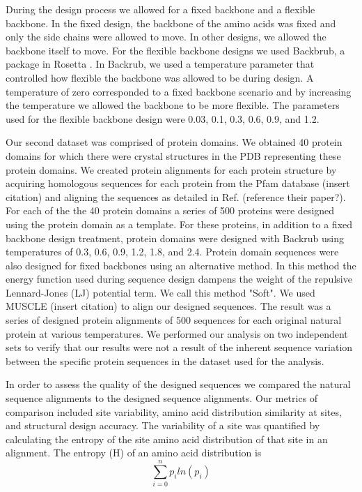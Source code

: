 \documentclass[12pt]{article}
\begin{document}
\par During the design process we allowed for a fixed backbone and a flexible backbone. In the fixed design, the backbone of the amino acids was fixed and only the side chains were allowed to move. In other designs, we allowed the backbone itself to move. For the flexible backbone designs we used Backbrub, a package in Rosetta \cite{Smith2008}. In Backrub, we used a temperature parameter that controlled how flexible the backbone was allowed to be during design. A temperature of zero corresponded to a fixed backbone scenario and by increasing the temperature we allowed the backbone to be more flexible. The parameters used for the flexible backbone design were 0.03, 0.1, 0.3, 0.6, 0.9, and 1.2. 
\par Our second dataset was comprised of protein domains. We obtained 40 protein domains for which there were crystal structures in the PDB representing these protein domains.  We created protein alignments for each protein structure by acquiring homologous sequences for each protein from the Pfam database (insert citation) and aligning the sequences as detailed in Ref. (reference their paper?).   For each of the the 40 protein domains a series of 500 proteins  were designed using the protein domain as a template. For these proteins, in addition to a fixed backbone design treatment, protein domains were designed with Backrub using temperatures of 0.3, 0.6, 0.9, 1.2, 1.8, and 2.4. Protein domain sequences were also designed for fixed backbones using an alternative method. In this method the energy function used during sequence design dampens the weight of the repulsive Lennard-Jones (LJ) potential term. We call this method "Soft".  We used MUSCLE (insert citation) to align our designed sequences. The result was a series of designed protein alignments of 500 sequences for each original natural protein at various temperatures.  We performed our analysis on two independent sets to verify that our results were not a result of the inherent sequence variation between the specific protein sequences in the dataset used for the analysis. 
\par In order to assess the quality of the designed sequences we compared the natural sequence alignments to the designed sequence alignments. Our metrics of comparison included site variability, amino acid distribution similarity at sites, and structural design accuracy. The variability of a site was quantified by calculating the entropy of the site amino acid distribution of that site in an alignment. 
The entropy (H) of an amino acid distribution is	$$ \sum_{i=0}^{n}p_iln{\left(p_i \right)} $$
\end{document}
